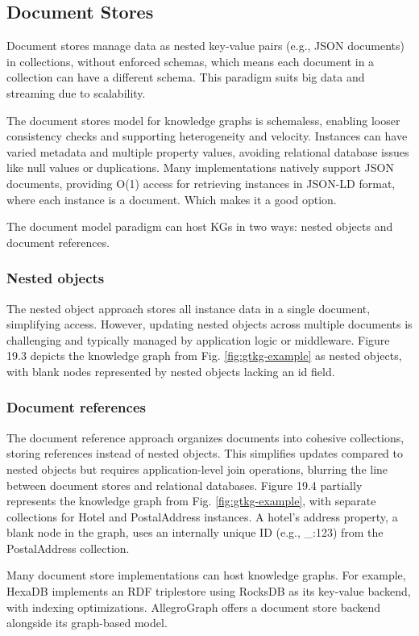 \documentclass[12pt]{article}
\begin{document}
\subsection{Document Stores}
Document stores manage data as nested key-value pairs (e.g., JSON documents) in collections, without enforced schemas, which means each document in a collection can have a different schema. This paradigm suits big data and streaming due to scalability.

The document stores model for knowledge graphs is schemaless, enabling looser consistency checks and supporting heterogeneity and velocity. Instances can have varied metadata and multiple property values, avoiding relational database issues like null values or duplications. Many implementations natively support JSON documents, providing O(1) access for retrieving instances in JSON-LD format, where each instance is a document. Which makes it a good option.

The document model paradigm can host KGs in two ways: nested objects and document references.
\subsubsection{Nested objects}
The nested object approach stores all instance data in a single document, simplifying access. However, updating nested objects across multiple documents is challenging and typically managed by application logic or middleware. Figure 19.3 depicts the knowledge graph from Fig. \ref{fig:gtkg-example} as nested objects, with blank nodes represented by nested objects lacking an id field.
\subsubsection{Document references}
The document reference approach organizes documents into cohesive collections, storing references instead of nested objects. This simplifies updates compared to nested objects but requires application-level join operations, blurring the line between document stores and relational databases. Figure 19.4 partially represents the knowledge graph from Fig. \ref{fig:gtkg-example}, with separate collections for Hotel and PostalAddress instances. A hotel's address property, a blank node in the graph, uses an internally unique ID (e.g., \_:123) from the PostalAddress collection.

Many document store implementations can host knowledge graphs. For example, HexaDB implements an RDF triplestore using RocksDB as its key-value backend, with indexing optimizations. AllegroGraph offers a document store backend alongside its graph-based model.
\end{document}
